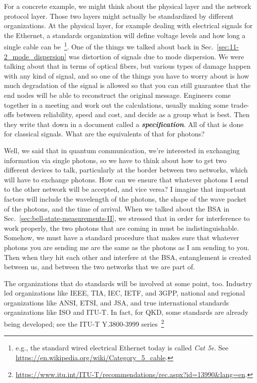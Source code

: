 For a concrete example, we might think about the physical layer and the network protocol layer. Those two layers might actually be standardized by different organizations. At the physical layer, for example dealing with electrical signals for the Ethernet, a standards organization will define voltage levels and how long a single cable can be~\footnote{e.g., the standard wired electrical Ethernet today is called \emph{Cat 5e}. See \url{https://en.wikipedia.org/wiki/Category_5_cable}.}. One of the things we talked about back in Sec.~\ref{sec:11-2_mode_dispersion} was distortion of signals due to mode dispersion. We were talking about that in terms of optical fibers, but various types of damage happen with any kind of signal, and so one of the things you have to worry about is how much degradation of the signal is allowed so that you can still guarantee that the end nodes will be able to reconstruct the original message. Engineers come together in a meeting and work out the calculations, usually making some trade-offs between reliability, speed and cost, and decide as a group what is best. Then they write that down in a document called a \textbf{\emph{specification}}. All of that is done for classical signals. What are the equivalents of that for photons?

\mmm Well, we said that in quantum communication, we're interested in exchanging information via single photons, so we have to think about how to get two different devices to talk, particularly at the border between two networks, which will have to exchange photons. How can we ensure that whatever photons I send to the other network will be accepted, and vice versa? I imagine that important factors will include the wavelength of the photons, the shape of the wave packet of the photons, and the time of arrival. When we talked about the BSA in Sec.~\ref{sec:bell-state-measurements-II}, we stressed that in order for interference to work properly, the two photons that are coming in must be indistinguishable. Somehow, we must have a standard procedure that makes sure that whatever photons you are sending me are the same as the photons as I am sending to you. Then when they hit each other and interfere at the BSA, entanglement is created between us, and between the two networks that we are part of.

\rrr The organizations that do standards will be involved at some point, too. Industry led organizations like IEEE, TIA, IEC, IETF, and 3GPP, national and regional organizations like ANSI, ETSI, and JSA, and true international standards organizations like ISO and ITU-T. In fact, for QKD, some standards are already being developed; see the ITU-T Y.3800-3999 series~\footnote{\url{https://www.itu.int/ITU-T/recommendations/rec.aspx?id=13990&lang=en}.}

